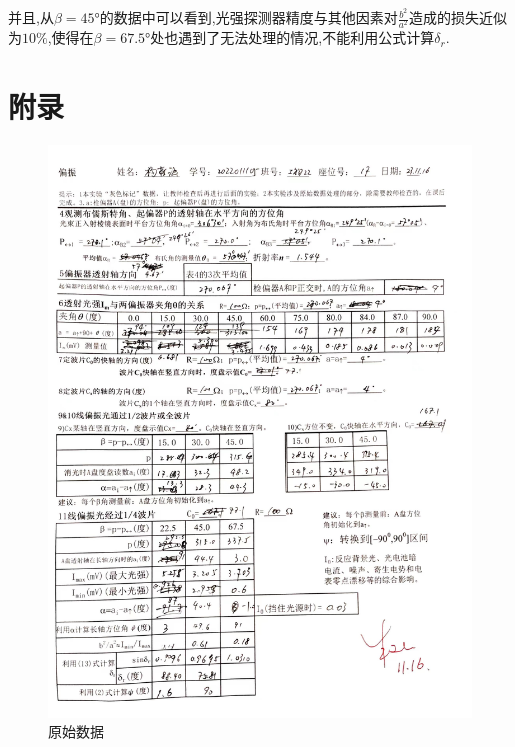 \documentclass[UTF8,a4paper]{article}%
\begin{document}
并且,从$\beta=\ang{45}$的数据中可以看到,光强探测器精度与其他因素对$\frac{b^2}{a^2}$造成的损失近似为$10\%$,使得在$\beta=\ang{67.5}$处也遇到了无法处理的情况,不能利用公式计算$\delta_r$.
\appendix
\section{附录}
\begin{figure}[H]
    \centering
    \begin{minipage}[t]{0.9\linewidth}
        \centering
        \includegraphics[width=0.9\linewidth]{data.jpeg}
        \caption{原始数据}
    \end{minipage}
\end{figure}
\end{document}
